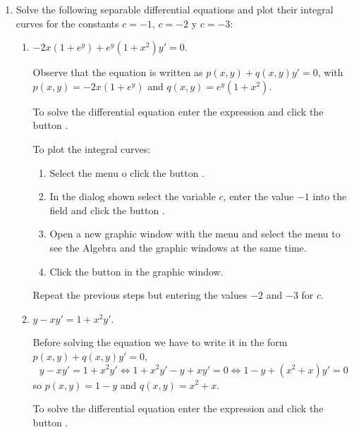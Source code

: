 \begin{enumerate}[leftmargin=*]
\item Solve the following separable differential equations and plot their integral curves for the constants  $c=-1$, $c=-2$ y $c=-3$:
\begin{enumerate}
\item $-2x(1+e^y)+e^y(1+x^{2})y'=0$.
\begin{indication}
Observe that the equation is written as $p(x,y)+q(x,y)y'=0$, with $p(x,y)=-2x(1+e^y)$ and
$q(x,y)=e^y(1+x^{2})$.

To solve the differential equation enter the expression  and click the button .

To plot the integral curves:
\begin{enumerate}[resume]
\item Select the menu  o click the button .
\item In the dialog shown select the variable $c$, enter the value $-1$ into the field  and click the
button .
\item Open a new graphic window with the menu  and select the menu  to see the Algebra and the graphic windows at the same time.
\item Click the button  in the graphic window.
\end{enumerate}
Repeat the previous steps but entering the values $-2$ and $-3$ for $c$.
\end{indication}

\item $y-xy'=1+x^2y'$.
\begin{indication}
Before solving the equation we have to write it in the form $p(x,y)+q(x,y)y'=0$,
\[
y-xy'=1+x^2y' \Leftrightarrow 1+x^2y'-y+xy'=0 \Leftrightarrow 1-y+(x^2+x)y'=0
\]
so $p(x,y)=1-y$ and $q(x,y)=x^2+x$.

To solve the differential equation enter the expression  and click the button .


\end{indication}
\end{enumerate}
\end{enumerate}
